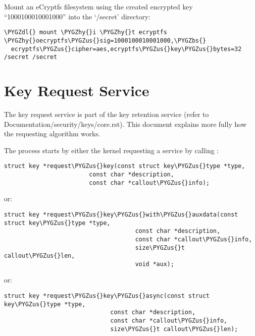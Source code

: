 \documentclass[a4paper,8pt,english]{sphinxmanual}
\def\PYGZbs{\char`\\}
\def\PYGZus{\char`\_}
\def\PYGZdl{\char`\$}
\def\PYGZhy{\char`\-}
\begin{document}
Mount an eCryptfs filesystem using the created encrypted key ``1000100010001000''
into the `/secret' directory:

\begin{Verbatim}[commandchars=\\\{\}]
\PYGZdl{} mount \PYGZhy{}i \PYGZhy{}t ecryptfs \PYGZhy{}oecryptfs\PYGZus{}sig=1000100010001000,\PYGZbs{}
  ecryptfs\PYGZus{}cipher=aes,ecryptfs\PYGZus{}key\PYGZus{}bytes=32 /secret /secret
\end{Verbatim}


\section{Key Request Service}
\label{security/keys/request-key:key-request-service}\label{security/keys/request-key::doc}
The key request service is part of the key retention service (refer to
Documentation/security/keys/core.rst).  This document explains more fully how
the requesting algorithm works.

The process starts by either the kernel requesting a service by calling
:

\begin{Verbatim}[commandchars=\\\{\}]
struct key *request\PYGZus{}key(const struct key\PYGZus{}type *type,
                        const char *description,
                        const char *callout\PYGZus{}info);
\end{Verbatim}

or:

\begin{Verbatim}[commandchars=\\\{\}]
struct key *request\PYGZus{}key\PYGZus{}with\PYGZus{}auxdata(const struct key\PYGZus{}type *type,
                                     const char *description,
                                     const char *callout\PYGZus{}info,
                                     size\PYGZus{}t callout\PYGZus{}len,
                                     void *aux);
\end{Verbatim}

or:

\begin{Verbatim}[commandchars=\\\{\}]
struct key *request\PYGZus{}key\PYGZus{}async(const struct key\PYGZus{}type *type,
                              const char *description,
                              const char *callout\PYGZus{}info,
                              size\PYGZus{}t callout\PYGZus{}len);
\end{Verbatim}
\end{document}
